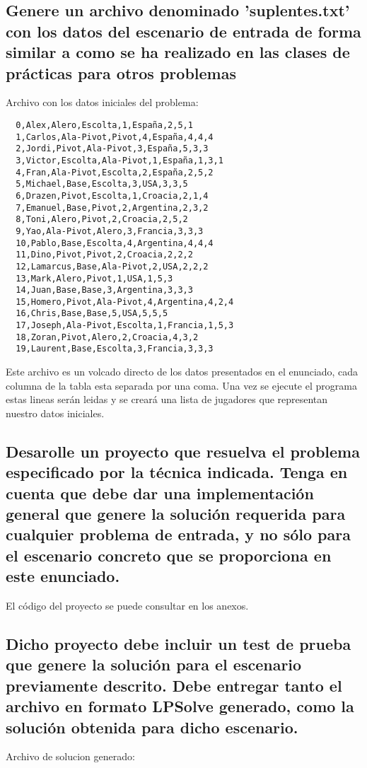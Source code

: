 \documentclass[a4paper,12pt]{article}
\begin{document}
\subsection{Genere un archivo denominado 'suplentes.txt' con los datos del escenario de entrada
de forma similar a como se ha realizado en las clases de prácticas para otros problemas}
Archivo con los datos iniciales del problema:
\begin{verbatim}
  0,Alex,Alero,Escolta,1,España,2,5,1
  1,Carlos,Ala-Pivot,Pivot,4,España,4,4,4
  2,Jordi,Pivot,Ala-Pivot,3,España,5,3,3
  3,Victor,Escolta,Ala-Pivot,1,España,1,3,1
  4,Fran,Ala-Pivot,Escolta,2,España,2,5,2
  5,Michael,Base,Escolta,3,USA,3,3,5
  6,Drazen,Pivot,Escolta,1,Croacia,2,1,4
  7,Emanuel,Base,Pivot,2,Argentina,2,3,2
  8,Toni,Alero,Pivot,2,Croacia,2,5,2
  9,Yao,Ala-Pivot,Alero,3,Francia,3,3,3
  10,Pablo,Base,Escolta,4,Argentina,4,4,4
  11,Dino,Pivot,Pivot,2,Croacia,2,2,2
  12,Lamarcus,Base,Ala-Pivot,2,USA,2,2,2
  13,Mark,Alero,Pivot,1,USA,1,5,3
  14,Juan,Base,Base,3,Argentina,3,3,3
  15,Homero,Pivot,Ala-Pivot,4,Argentina,4,2,4
  16,Chris,Base,Base,5,USA,5,5,5
  17,Joseph,Ala-Pivot,Escolta,1,Francia,1,5,3
  18,Zoran,Pivot,Alero,2,Croacia,4,3,2
  19,Laurent,Base,Escolta,3,Francia,3,3,3
\end{verbatim}
Este archivo es un volcado directo de los datos presentados en el enunciado, cada columna de la tabla esta separada por una coma.
Una vez se ejecute el programa estas lineas serán leidas y se creará una lista de jugadores que representan nuestro datos iniciales.
\subsection{Desarolle un proyecto que resuelva el problema especificado por la técnica indicada.
Tenga en cuenta que debe dar una implementación general que genere la solución requerida para
cualquier problema de entrada, y no sólo para el escenario concreto que se proporciona en este enunciado.}
El código del proyecto se puede consultar en los anexos.

\subsection{Dicho proyecto debe incluir un test de prueba que genere la solución para el escenario previamente descrito.
Debe entregar tanto el archivo en formato LPSolve generado, como la solución obtenida para dicho escenario.}

Archivo de solucion generado:
\end{document}
